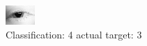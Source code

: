 \begin{figure}[h!]
\begin{center}
\includegraphics[width=0.60\columnwidth]{figures/ID155_class_4_target_3.png}
\end{center}
\caption{ Classification: 4 actual target: 3}
\label{fig:ID155_class_4_target_3}
\end{figure}
